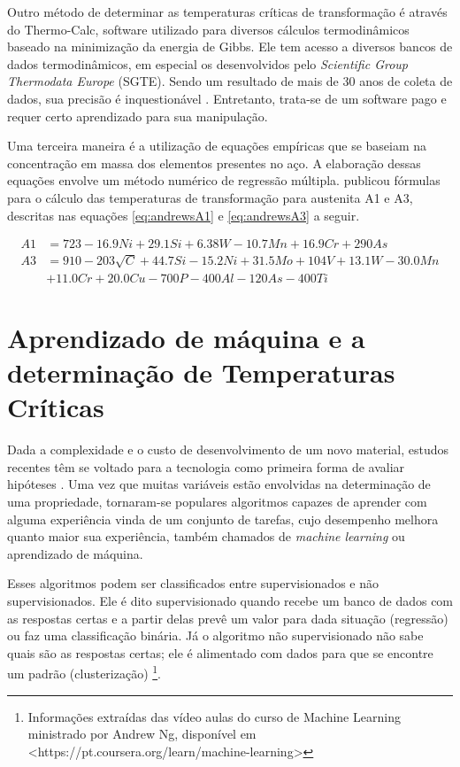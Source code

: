 \documentclass[brazil,tf,epusp]{usp}  %
\begin{document}
Outro método de determinar as temperaturas críticas de transformação é através do Thermo-Calc\textregistered{}, software utilizado para diversos cálculos termodinâmicos baseado na minimização da energia de Gibbs. Ele tem acesso a diversos bancos de dados termodinâmicos, em especial os desenvolvidos pelo \textit{Scientific Group Thermodata Europe} (SGTE). Sendo um resultado de mais de 30 anos de coleta de dados, sua precisão é inquestionável \cite{TC2002}. Entretanto, trata-se de um software pago e requer certo aprendizado para sua manipulação.

Uma terceira maneira é a utilização de equações empíricas que se baseiam na concentração em massa dos elementos presentes no aço. A elaboração dessas equações envolve um método numérico de regressão múltipla.
   publicou fórmulas para o cálculo das temperaturas de transformação para austenita A1 e A3, descritas nas equações \ref{eq:andrewsA1} e \ref{eq:andrewsA3} a seguir.

\begin{align}
  A1 &= 723 - 16.9 Ni + 29.1 Si + 6.38 W - 10.7 Mn + 16.9 Cr + 290 As \label{eq:andrewsA1}\\
  A3 &= 910 - 203 \sqrt{C}  + 44.7 Si - 15.2 Ni + 31.5 Mo + 104 V + 13.1 W - 30.0 Mn \nonumber \\
     & + 11.0 Cr + 20.0 Cu - 700 P - 400 Al - 120 As - 400 Ti \label{eq:andrewsA3}
\end{align}

\section{Aprendizado de m\'aquina e a determinação de Temperaturas Cr\'iticas}

Dada a complexidade e o custo de desenvolvimento de um novo material, estudos recentes têm se voltado para a tecnologia como primeira forma de avaliar hipóteses \cite{Belisle2015}. Uma vez que muitas variáveis estão envolvidas na determinação de uma propriedade, tornaram-se populares algoritmos capazes de aprender com alguma experiência vinda de um conjunto de tarefas, cujo desempenho melhora quanto maior sua experiência, também chamados de \textit{machine learning} ou aprendizado de máquina.

Esses algoritmos podem ser classificados entre supervisionados e não supervisionados. Ele é dito supervisionado quando recebe um banco de dados com as respostas certas e a partir delas prevê um valor para dada situação (regressão) ou faz uma classificação binária. Já o algoritmo não supervisionado não sabe quais são as respostas certas; ele é alimentado com dados para que se encontre um padrão (clusterização) \footnote{Informações extraídas das vídeo aulas do curso de Machine Learning ministrado por Andrew Ng, disponível em <https://pt.coursera.org/learn/machine-learning>}.
\end{document}
